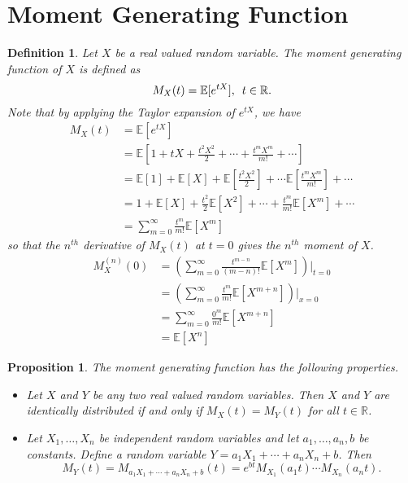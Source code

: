 \documentclass[1pt]{report}
\newtheorem{prop}[thm]{Proposition}
\newtheorem{defn}[thm]{Definition}
\newcommand{\Rone}{\mathbb{R}}
\newcommand{\R}{\Rone}
\newcommand{\<}{\langle}
\renewcommand{\>}{\rangle}
\newcommand{\E}{\mathbb{E}}
\begin{document}
\section{Moment Generating Function}
\begin{defn}\label{def:momentgeneratingfunction}
Let $X$ be a real valued random variable. The \emph{moment generating function} of $X$ is defined as
$$M_X(t) = \mathbb{E}[e^{tX}], \enskip t \in \R.$$
Note that by applying the Taylor expansion of $e^{tX}$, we have
\begin{align*}
M_X(t) & = \E[e^{tX}]\\
& = \E\left[1 +t X + \frac{t^2X^2}{2} + \cdots + \frac{t^mX^m}{m!} + \cdots \right]\\
& = \E[1] + \E[X] + \E\left[\frac{t^2 X^2}{2}\right] + \cdots \E\left[\frac{t^m X^m}{m!} \right] + \cdots \\
& = 1 + \E[X] + \frac{t^2}{2} \E[X^2] + \cdots + \frac{t^m}{m!}\E[X^m] + \cdots \\ 
& = \sum\limits_{m=0}^\infty \frac{t^m}{m!} \E[X^m]
\end{align*}
so that the $n^{th}$ derivative of $M_X(t)$ at $t=0$ gives the $n^{th}$ moment of $X$.
\begin{align*}
M_X^{(n)}(0) &= \left(\sum\limits_{m=0}^\infty \frac{t^{m-n}}{(m-n)!} \E[X^m]\right)\Big|_{t=0}\\
& = \left(\sum\limits_{m=0}^\infty \frac{t^m}{m!} \E[X^{m+n}]\right)\Big|_{x=0}\\
& = \sum\limits_{m=0}^\infty \frac{0^m}{m!}\E[X^{m+n}]\\
& = \E[X^{n}]
\end{align*}
\end{defn}
\begin{prop}\label{prop:mgfproperties}
The moment generating function has the following properties.
\begin{itemize}
\item Let $X$ and $Y$ be any two real valued random variables. Then $X$ and $Y$ are identically distributed if and only if $M_X(t) = M_Y(t)$ for all $t \in \R$.
\item Let $X_1, \dots, X_n$ be independent random variables and let $a_1, \dots, a_n, b$ be constants. Define a random variable $Y = a_1 X_1 + \cdots + a_n X_n + b$. Then
$$M_Y(t) = M_{a_1X_1 + \cdots + a_n X_n + b}(t)= e^{bt}M_{X_1}(a_1t)\cdots M_{X_n}(a_n t).$$
\end{itemize}
\end{prop}
\end{document}

